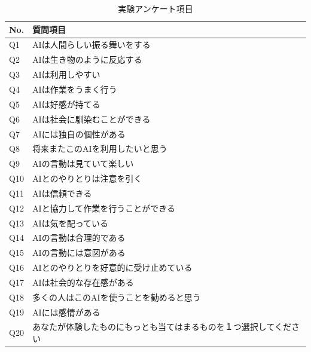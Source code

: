 \documentclass[10pt,twocolumn]{jsarticle}
\begin{document}
\begin{table}[htbp]
    \centering
    \caption{実験アンケート項目}
    \label{tab:ques}
    
    \begin{tabularx}{\linewidth}{lX}
        \hline
        No. & 質問項目 \\
        \hline
        Q1 & AIは人間らしい振る舞いをする \\
        Q2 & AIは生き物のように反応する \\ 
        Q3 & AIは利用しやすい \\
        Q4 & AIは作業をうまく行う \\
        Q5 & AIは好感が持てる \\ 
        Q6 & AIは社会に馴染むことができる \\
        Q7 & AIには独自の個性がある \\
        Q8 & 将来またこのAIを利用したいと思う \\
        Q9 & AIの言動は見ていて楽しい \\
        Q10 & AIとのやりとりは注意を引く \\
        Q11 & AIは信頼できる \\ 
        Q12 & AIと協力して作業を行うことができる \\
        Q13 & AIは気を配っている \\
        Q14 & AIの言動は合理的である \\
        Q15 & AIの言動には意図がある \\
        Q16 & AIとのやりとりを好意的に受け止めている \\ 
        Q17 & AIは社会的な存在感がある \\
        Q18 & 多くの人はこのAIを使うことを勧めると思う \\ 
        Q19 & AIには感情がある \\ 
        Q20 & あなたが体験したものにもっとも当てはまるものを１つ選択してください \\ 
        \hline
    \end{tabularx}
\end{table}
\end{document}
